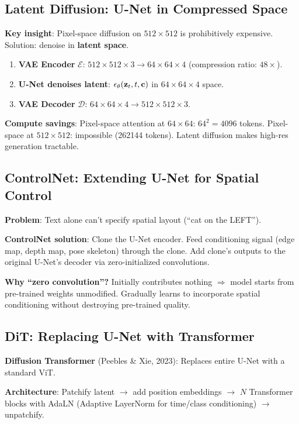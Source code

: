 \subsection{Latent Diffusion: U-Net in Compressed Space}

\textbf{Key insight}: Pixel-space diffusion on $512{\times}512$ is prohibitively expensive. Solution: denoise in \textbf{latent space}.

\begin{enumerate}
\item \textbf{VAE Encoder} $\mathcal{E}$: $512{\times}512{\times}3 \to 64{\times}64{\times}4$ (compression ratio: $48\times$).
\item \textbf{U-Net denoises latent}: $\epsilon_\theta(\mathbf{z}_t, t, \mathbf{c})$ in $64{\times}64{\times}4$ space.
\item \textbf{VAE Decoder} $\mathcal{D}$: $64{\times}64{\times}4 \to 512{\times}512{\times}3$.
\end{enumerate}

\textbf{Compute savings}: Pixel-space attention at $64{\times}64$: $64^2 = 4096$ tokens. Pixel-space at $512{\times}512$: impossible (262144 tokens). Latent diffusion makes high-res generation tractable.

\subsection{ControlNet: Extending U-Net for Spatial Control}
\textbf{Problem}: Text alone can't specify spatial layout (``cat on the LEFT'').

\textbf{ControlNet solution}: Clone the U-Net encoder. Feed conditioning signal (edge map, depth map, pose skeleton) through the clone. Add clone's outputs to the original U-Net's decoder via zero-initialized convolutions.

\textbf{Why ``zero convolution''?} Initially contributes nothing $\Rightarrow$ model starts from pre-trained weights unmodified. Gradually learns to incorporate spatial conditioning without destroying pre-trained quality.

\subsection{DiT: Replacing U-Net with Transformer}
\textbf{Diffusion Transformer} (Peebles \& Xie, 2023): Replaces entire U-Net with a standard ViT.

\textbf{Architecture}: Patchify latent $\to$ add position embeddings $\to$ $N$ Transformer blocks with AdaLN (Adaptive LayerNorm for time/class conditioning) $\to$ unpatchify.

